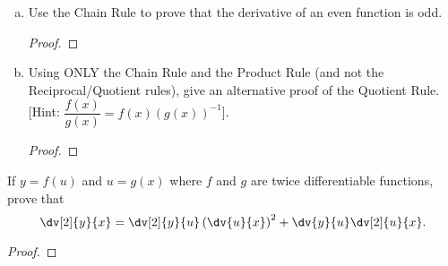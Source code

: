 \question \begin{enumerate}[(a)]
  \item Use the Chain Rule to prove that the derivative of an even function is odd.
        \begin{proof}
        \end{proof}
  \item Using ONLY the Chain Rule and the Product Rule (and not the Reciprocal/Quotient rules),
        give an alternative proof of the Quotient Rule.
          [Hint: $\dfrac{f(x)}{g(x)}=f(x)(g(x))^{-1}$].
        \begin{proof}
        \end{proof}
\end{enumerate}


\question If $y=f(u)$ and $u=g(x)$ where $f$ and $g$ are twice differentiable functions, prove that
\[\dv[2]{y}{x} = \dv[2]{y}{u}\left(\dv{u}{x}\right)^2 + \dv{y}{u}\dv[2]{u}{x}. \]
\begin{proof}
\end{proof}

